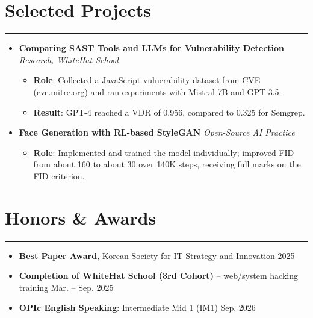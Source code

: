 \documentclass[letterpaper, 10pt]{article}
\begin{document}
\section*{Selected Projects}
\hrule
\vspace{4pt}
\begin{itemize}
   \item[]
       \textbf{Comparing SAST Tools and LLMs for Vulnerability Detection} \hfill \textit{Research, WhiteHat School}
       \begin{itemize}
           \item \textbf{Role}: Collected a JavaScript vulnerability dataset from CVE (cve.mitre.org) and ran experiments with Mistral-7B and GPT-3.5.
           \item \textbf{Result}: GPT-4 reached a VDR of 0.956, compared to 0.325 for Semgrep.
       \end{itemize}
   \item[]
       \textbf{Face Generation with RL-based StyleGAN} \hfill \textit{Open-Source AI Practice}
       \begin{itemize}
           \item \textbf{Role}: Implemented and trained the model individually; improved FID from about 160 to about 30 over 140K steps, receiving full marks on the FID criterion.
       \end{itemize}
\end{itemize}

\section*{Honors \& Awards}
\hrule
\vspace{4pt}
\begin{itemize}
   \item \textbf{Best Paper Award}, Korean Society for IT Strategy and Innovation \hfill 2025
   \item \textbf{Completion of WhiteHat School (3rd Cohort)} -- web/system hacking training \hfill Mar. -- Sep. 2025
   \item \textbf{OPIc English Speaking}: Intermediate Mid 1 (IM1) \hfill Sep. 2026
\end{itemize}

\end{document}
